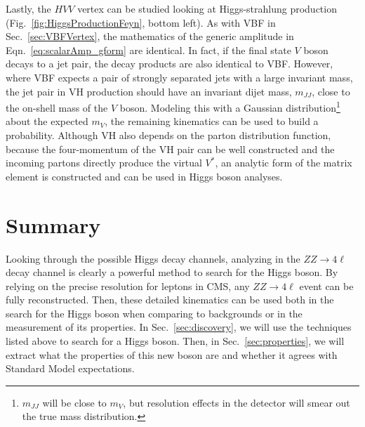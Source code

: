 Lastly, the $HVV$ vertex can be studied looking at Higgs-strahlung production (Fig.~\ref{fig:HiggsProductionFeyn}, bottom left). As with VBF in Sec.~\ref{sec:VBFVertex}, the mathematics of the generic amplitude in Eqn.~\ref{eq:scalarAmp_gform} are identical. In fact, if the final state $V$ boson decays to a jet pair, the decay products are also identical to VBF. However, where VBF expects a pair of strongly separated jets with a large invariant mass, the jet pair in VH production should have an invariant dijet mass, $m_{JJ}$, close to the on-shell mass of the $V$ boson. Modeling this with a Gaussian distribution\footnote{$m_{JJ}$ will be close to $m_V$, but resolution effects in the detector will smear out the true mass distribution.} about the expected $m_V$, the remaining kinematics can be used to build a probability. Although VH also depends on the parton distribution function, because the four-momentum of the VH pair can be well constructed and the incoming partons directly produce the virtual $V^*$, an analytic form of the matrix element is constructed and can be used in Higgs boson analyses.

\section{Summary}
\label{sec:pheno_summary}

Looking through the possible Higgs decay channels, analyzing in the $ZZ \rightarrow 4\ell$ decay channel is clearly a powerful method to search for the Higgs boson. By relying on the precise resolution for leptons in CMS, any $ZZ \rightarrow 4\ell$ event can be fully reconstructed. Then, these detailed kinematics can be used both in the search for the Higgs boson when comparing to backgrounds or in the measurement of its properties. In Sec.~\ref{sec:discovery}, we will use the techniques listed above to search for a Higgs boson. Then, in Sec.~\ref{sec:properties}, we will extract what the properties of this new boson are and whether it agrees with Standard Model expectations.
